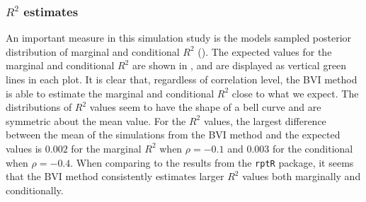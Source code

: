 \subsubsection{$R^2$ estimates}
An important measure in this simulation study is the models sampled posterior distribution of marginal and conditional $R^2$ (). The expected values for the marginal and conditional $R^2$ are shown in , and are displayed as vertical green lines in each plot. It is clear that, regardless of correlation level, the BVI method is able to estimate the marginal and conditional $R^2$ close to what we expect. The distributions of $R^2$ values seem to have the shape of a bell curve and are symmetric about the mean value. For the $R^2$ values, the largest difference between the mean of the simulations from the BVI method and the expected values is $0.002$ for the marginal $R^2$ when $\rho=-0.1$ and $0.003$ for the conditional when $\rho=-0.4$. When comparing to the results from the \texttt{rptR} package, it seems that the BVI method consistently estimates larger $R^2$ values both marginally and conditionally. 
